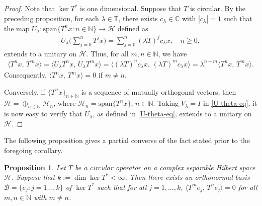 \documentclass[a4paper,oneside,10pt, reqno]{amsproc}
\newtheorem{proposition}[theorem]{Proposition}%
\theoremstyle{remark}
\newtheorem{remark}[theorem]{Remark}%
\theoremstyle{definition}
\newtheorem{example}[theorem]{Example}
\newcommand{\beqn}{\begin{eqnarray*}}
\newcommand{\eeqn}{\end{eqnarray*}}
\newcommand{\rar}{\rightarrow}
\newcommand{\inp}[2]{\langle{#1},\,{#2} \rangle}
\begin{document}
\begin{proof}
Note that $\ker T^*$ is one dimensional. Suppose that $T$ is circular. By the preceding proposition, for each $\lambda \in \mathbb T$, there exists $c_\lambda \in \mathbb C$ with $|c_\lambda| = 1$ such that the map $U_\lambda : \mathrm{span}\{T^n x : n \in \mathbb N\} \rar \mathcal H$ defined as
\beqn
U_\lambda \Big(\sum_{j=0}^n T^j x \Big) = \sum_{j=0}^n (\lambda T)^j c_\lambda x,  \quad n \geqslant 0,
\eeqn
extends to a unitary on $\mathcal H$. Thus, for all $m, n \in \mathbb N$, we have
\beqn
\inp{T^n x}{T^m x} = \inp{U_\lambda T^n x}{U_\lambda T^m x} = \inp{(\lambda T)^n c_\lambda x}{(\lambda T)^m c_\lambda x}= \lambda^{n-m}\inp{T^n x}{T^m x}.
\eeqn 
Consequently, $\inp{T^n x}{T^m x} = 0$ if $m \neq n$.

Conversely, if $\{T^n x\}_{n \in \mathbb N}$ is a sequence of mutually orthogonal vectors, then $\mathcal H = \oplus_{n \in \mathbb N} \mathcal H_n$, where $\mathcal H_n = \text{span}\{T^n x\}$, $n \in \mathbb N$. Taking $V_\lambda = I$ in \eqref{U-theta-eq}, it is now easy to verify that $U_\lambda$, as defined in \eqref{U-theta-eq}, extends to a unitary on $\mathcal H$. 
\end{proof}

%
%

The following proposition gives a partial converse of the fact stated prior to the foregoing corollary.

\begin{proposition}
Let $T$ be a circular operator on a complex separable Hilbert space $\mathcal H$. Suppose that $k := \dim \ker T^* < \infty$. Then there exists an orthonormal basis $\mathscr B = \{e_j : j=1 \ldots, k\}$ of $\ker T^*$ such that for all $j = 1, \ldots, k$, $\inp{T^m e_j}{T^n e_j} = 0$ for all $m, n \in \mathbb N$ with $m \neq n$.
\end{proposition}
\end{document}
